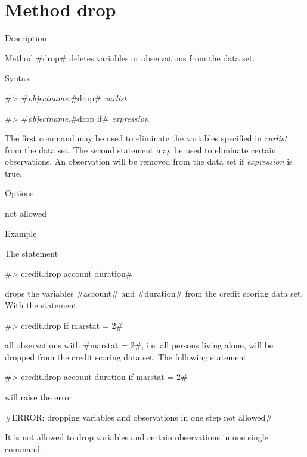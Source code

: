 \clearpage

\section{Method drop}
\label{drop}   


\begin{stanza}{Description}

{Method #drop# deletes variables or observations from the data set.}
\end{stanza}

\begin{stanza}{Syntax}

{#> #{\em objectname}.#drop# {\em varlist}

#> #{\em objectname}.#drop if# {\em expression}

The first command may be used to eliminate the variables specified
in {\em varlist} from the data set. The second statement may be
used to eliminate certain observations. An observation will be
removed from the data set if {\em expression} is true.}
\end{stanza}


\begin{stanza}{Options}

{not allowed}
\end{stanza}


\begin{stanza}{Example}

The statement

#> credit.drop account duration#

drops the variables #account# and #duration# from the credit scoring data set. With the statement

#> credit.drop if marstat = 2#

all observations with #marstat = 2#, i.e. all persons living
alone, will be dropped from the credit scoring data set. The
following statement

#> credit.drop account duration if marstat = 2#

will raise the error

#ERROR: dropping variables and observations in one step not allowed#

It is not allowed to drop variables and certain observations in
one single command.
\end{stanza}



